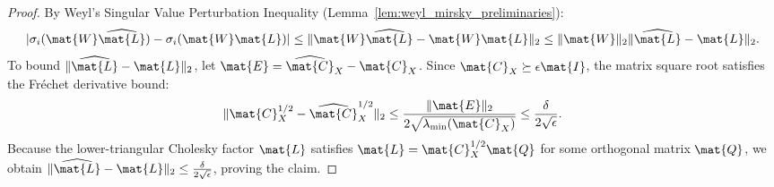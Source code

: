 \begin{proof}
By Weyl's Singular Value Perturbation Inequality (Lemma~\ref{lem:weyl_mirsky_preliminaries}):
\begin{equation}
|\sigma_i(\mat{W}\widehat{\mat{L}}) - \sigma_i(\mat{W}\mat{L})| \le \|\mat{W}\widehat{\mat{L}} - \mat{W}\mat{L}\|_2 \le \|\mat{W}\|_2 \|\widehat{\mat{L}} - \mat{L}\|_2.
\end{equation}
To bound $\|\widehat{\mat{L}} - \mat{L}\|_2$, let $\mat{E} = \widehat{\mat{C}}_X - \mat{C}_X$. Since $\mat{C}_X \succeq \epsilon \mat{I}$, the matrix square root satisfies the Fr\'echet derivative bound:
\begin{equation}
\|\mat{C}_X^{1/2} - \widehat{\mat{C}}_X^{1/2}\|_2 \le \frac{\|\mat{E}\|_2}{2 \sqrt{\lambda_{\min}(\mat{C}_X)}} \le \frac{\delta}{2\sqrt{\epsilon}}.
\end{equation}
Because the lower-triangular Cholesky factor $\mat{L}$ satisfies $\mat{L} = \mat{C}_X^{1/2} \mat{Q}$ for some orthogonal matrix $\mat{Q}$, we obtain $\|\widehat{\mat{L}} - \mat{L}\|_2 \le \frac{\delta}{2\sqrt{\epsilon}}$, proving the claim.
\end{proof}

